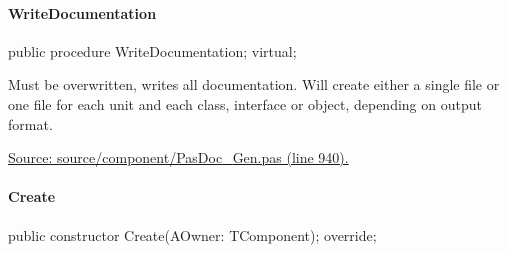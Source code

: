 \documentclass{report}
\newif\ifpdf
\begin{document}
\paragraph*{WriteDocumentation}\hspace*{\fill}

\label{PasDoc_Gen.TDocGenerator-WriteDocumentation}
\begin{list}{}{
\setlength{\itemindent}{0cm}
\setlength{\listparindent}{0cm}
\setlength{\leftmargin}{\evensidemargin}
\addtolength{\leftmargin}{\tmplength}
\settowidth{\labelsep}{X}
\addtolength{\leftmargin}{\labelsep}
\setlength{\labelwidth}{\tmplength}
}
\item[\textbf{Declaration}\hfill]
\ifpdf
\begin{flushleft}
\fi
\begin{ttfamily}
public procedure WriteDocumentation; virtual;\end{ttfamily}

\ifpdf
\end{flushleft}
\fi

\par
\item[\textbf{Description}]
Must be overwritten, writes all documentation. Will create either a single file or one file for each unit and each class, interface or object, depending on output format.\par
\href{https://github.com/pasdoc/pasdoc/blob/master/source/component/PasDoc_Gen.pas#L940}{Source: source/component/PasDoc{\_}Gen.pas (line 940).}

\end{list}
\paragraph*{Create}\hspace*{\fill}

\label{PasDoc_Gen.TDocGenerator-Create}
\begin{list}{}{
\setlength{\itemindent}{0cm}
\setlength{\listparindent}{0cm}
\setlength{\leftmargin}{\evensidemargin}
\addtolength{\leftmargin}{\tmplength}
\settowidth{\labelsep}{X}
\addtolength{\leftmargin}{\labelsep}
\setlength{\labelwidth}{\tmplength}
}
\item[\textbf{Declaration}\hfill]
\ifpdf
\begin{flushleft}
\fi
\begin{ttfamily}
public constructor Create(AOwner: TComponent); override;\end{ttfamily}

\ifpdf
\end{flushleft}
\fi

\end{list}
\end{document}
